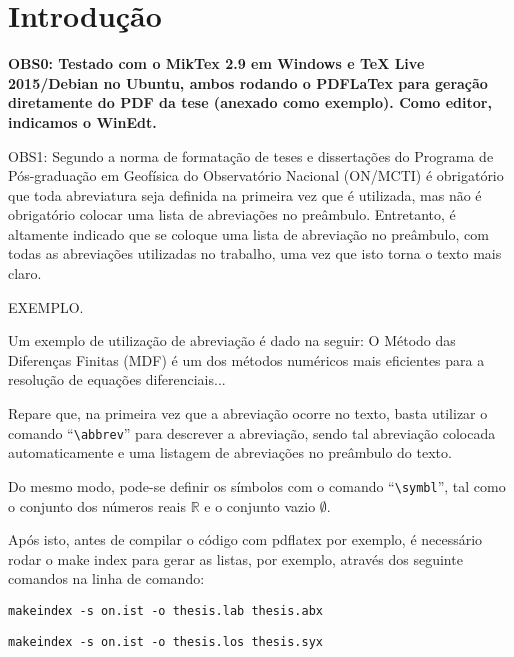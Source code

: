 \chapter{Introdução}

\textbf{OBS0: Testado com o MikTex 2.9 em Windows e TeX Live 2015/Debian no Ubuntu, ambos rodando o PDFLaTex para geração diretamente do PDF da tese (anexado como exemplo). Como editor, indicamos o WinEdt.}

OBS1: Segundo a norma de formatação de teses e disserta{\c c}\~oes do
Programa de Pós-graduação em Geofísica do Observatório Nacional (ON/MCTI)
é obrigatório que toda abreviatura seja definida na primeira vez que é
utilizada, mas não é obrigatório colocar uma lista de abreviações no preâmbulo.
Entretanto, é altamente indicado que se coloque uma lista de abreviação no
preâmbulo, com todas as abreviações utilizadas no trabalho, uma vez que isto
torna o texto mais claro.

EXEMPLO.

Um exemplo de utilização de abreviação é dado na seguir: O Método das Diferenças Finitas
(MDF) é um dos métodos numéricos mais eficientes
para a resolução de equações diferenciais...

Repare que, na primeira vez que a abreviação ocorre no texto, basta utilizar o comando
``\verb|\abbrev|'' para descrever a abreviação, sendo tal abreviação colocada automaticamente
e uma listagem de abreviações no preâmbulo do texto.

Do mesmo modo, pode-se definir os símbolos com o comando ``\verb|\symbl|'', tal como o
conjunto dos números reais $\mathbb{R}$ e o conjunto vazio $\emptyset$.

Após isto, antes de compilar o código com pdflatex por exemplo, é necessário rodar o make index
para gerar as listas, por exemplo, através dos seguinte comandos na linha de comando:

\verb|makeindex -s on.ist -o thesis.lab thesis.abx|

\verb|makeindex -s on.ist -o thesis.los thesis.syx|

